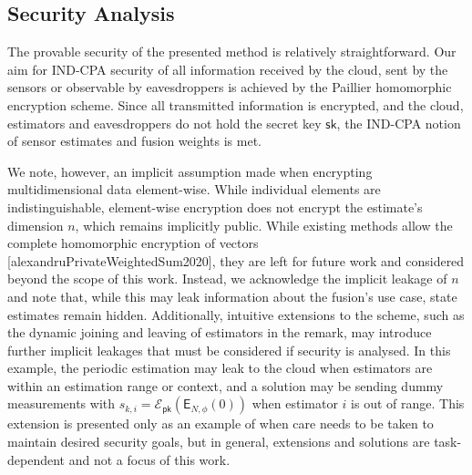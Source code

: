 % 
% 

\subsection{Security Analysis}\label{subsec:cloud_fusion:secfci2_security}
The provable security of the presented method is relatively straightforward. Our aim for IND-CPA security of all information received by the cloud, sent by the sensors or observable by eavesdroppers is achieved by the Paillier homomorphic encryption scheme. Since all transmitted information is encrypted, and the cloud, estimators and eavesdroppers do not hold the secret key $\mathsf{sk}$, the IND-CPA notion of sensor estimates and fusion weights is met.

We note, however, an implicit assumption made when encrypting multidimensional data element-wise. While individual elements are indistinguishable, element-wise encryption does not encrypt the estimate's dimension $n$, which remains implicitly public. While existing methods allow the complete homomorphic encryption of vectors [alexandruPrivateWeightedSum2020], they are left for future work and considered beyond the scope of this work. Instead, we acknowledge the implicit leakage of $n$ and note that, while this may leak information about the fusion's use case, state estimates remain hidden. Additionally, intuitive extensions to the scheme, such as the dynamic joining and leaving of estimators in the remark, may introduce further implicit leakages that must be considered if security is analysed. In this example, the periodic estimation may leak to the cloud when estimators are within an estimation range or context, and a solution may be sending dummy measurements with $s_{k,i}=\mathcal{E}_{\mathsf{pk}}(\mathsf{E}_{N,\phi}(0))$ when estimator $i$ is out of range. This extension is presented only as an example of when care needs to be taken to maintain desired security goals, but in general, extensions and solutions are task-dependent and not a focus of this work.


% 
% 
